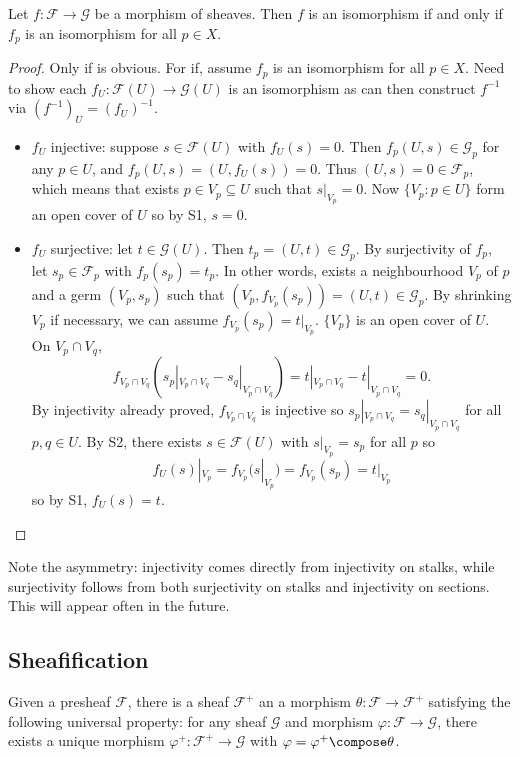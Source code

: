\documentclass[a4paper]{article}
\newcommand{\sh}[1]{\mathcal{#1}} %
\begin{document}
\begin{proposition}
  Let \(f: \sh F \to \sh G\) be a morphism of sheaves. Then \(f\) is an isomorphism if and only if \(f_p\) is an isomorphism for all \(p \in X\).
\end{proposition}

\begin{proof}
  Only if is obvious. For if, assume \(f_p\) is an isomorphism for all \(p \in X\). Need to show each \(f_U: \sh F(U) \to \sh G(U)\) is an isomorphism as can then construct \(f^{-1}\) via \((f^{-1})_U = (f_U)^{-1}\).
  \begin{itemize}
  \item \(f_U\) injective: suppose \(s \in \sh F(U)\) with \(f_U(s) = 0\). Then \(f_p(U, s) \in \sh G_p\) for any \(p \in U\), and \(f_p(U, s) = (U, f_U(s)) = 0\). Thus \((U, s) = 0 \in \sh F_p\), which means that exists \(p \in V_p \subseteq U\) such that \(s|_{V_p} = 0\). Now \(\{V_p: p \in U\}\) form an open cover of \(U\) so by S1, \(s = 0\).
  \item \(f_U\) surjective: let \(t \in \sh G(U)\). Then \(t_p = (U, t) \in \sh G_p\). By surjectivity of \(f_p\), let \(s_p \in \sh F_p\) with \(f_p(s_p) = t_p\). In other words, exists a neighbourhood \(V_p\) of \(p\) and a germ \((V_p, s_p)\) such that \((V_p, f_{V_p}(s_p)) = (U, t) \in \sh G_p\). By shrinking \(V_p\) if necessary, we can assume \(f_{V_p}(s_p) = t|_{V_p}\). \(\{V_p\}\) is an open cover of \(U\). On \(V_p \cap V_q\),
    \[
      f_{V_p \cap V_q} (s_p|_{V_p \cap V_q} - s_q|_{V_p \cap V_q}) = t|_{V_p \cap V_q} - t|_{V_p \cap V_q} = 0.
    \]
    By injectivity already proved, \(f_{V_p \cap V_q}\) is injective so \(s_p|_{V_p \cap V_q} = s_q|_{V_p \cap V_q}\) for all \(p, q \in U\). By S2, there exists \(s \in \sh F(U)\) with \(s|_{V_p} = s_p\) for all \(p\) so
    \[
      f_U(s)|_{V_p} = f_{V_p}(s|_{V_p}) = f_{V_p}(s_p) = t|_{V_p}
    \]
    so by S1, \(f_U(s) = t\).
  \end{itemize}
\end{proof}
Note the asymmetry: injectivity comes directly from injectivity on stalks, while surjectivity follows from both surjectivity on stalks and injectivity on sections. This will appear often in the future.

\subsection{Sheafification}

Given a presheaf \(\sh F\), there is a sheaf \(\sh F^+\) an a morphism \(\theta: \sh F \to \sh F^+\) satisfying the following universal property: for any sheaf \(\sh G\) and morphism \(\varphi: \sh F \to \sh G\), there exists a unique morphism \(\varphi^+: \sh F^+ \to \sh G\) with \(\varphi = \varphi^+ \compose \theta\).
\end{document}
